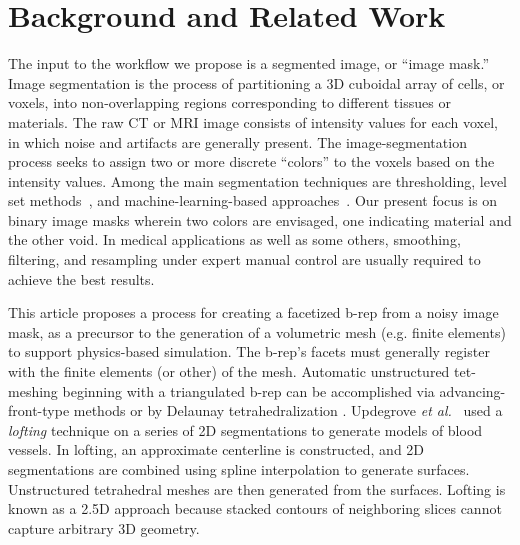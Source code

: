 \section{Background and Related Work}

The input to the workflow we propose is a segmented image, or ``image mask.''
Image segmentation is the process of partitioning a 3D cuboidal array of cells, or voxels, into non-overlapping regions corresponding to different tissues or materials.  The raw CT or MRI image consists of intensity values for each voxel, in which noise and artifacts are generally present.  The image-segmentation process seeks to assign two or more discrete ``colors'' to the voxels based on the intensity values.  Among the main segmentation techniques are thresholding, level set methods~\cite{malladi_1995, sethian_1996}, and machine-learning-based approaches~\cite{litjens_2017}.  Our present focus is on binary image masks wherein two colors are envisaged, one indicating material and the other void.  In medical applications as well as some others, smoothing, filtering, and resampling under expert manual control are usually required to achieve the best results.

This article proposes a process for creating a facetized b-rep from a noisy image mask, as a precursor to the generation of a volumetric mesh (e.g. finite elements) to support physics-based simulation.  The b-rep's facets must generally register with the finite elements (or other) of the mesh.  Automatic unstructured tet-meshing beginning with a triangulated b-rep can be accomplished via advancing-front-type methods \cite{jin_1993, lohner_1988} or by Delaunay tetrahedralization \cite{lohner_1997}. Updegrove \textit{et al.}~\cite{updegrove_2016} used a \textit{lofting} technique on a series of 2D segmentations to generate models of blood vessels. In lofting, an approximate centerline is constructed, and 2D segmentations are combined using spline interpolation to generate surfaces. Unstructured tetrahedral meshes are then generated from the surfaces. Lofting is known as a 2.5D approach because stacked contours of neighboring slices cannot capture arbitrary 3D geometry.

